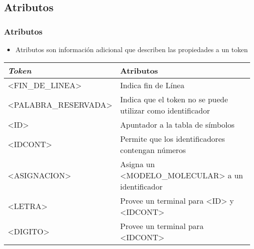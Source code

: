 \documentclass[14pt, aspectratio=169]{beamer}
\begin{document}
\subsection{Atributos}

\begin{frame}
    \frametitle{Atributos}
    \footnotesize
    \begin{itemize}
        \item Atributos son información adicional que describen las propiedades a un token
    \end{itemize}
    \begin{tabularx}{\textwidth}{|X|X|}
        \hline
        \textit{Token}       & Atributos                                                   \\\hline
        <FIN\_DE\_LINEA>     & Indica fin de Línea                                         \\\hline
        <PALABRA\_RESERVADA> & Indica que el token no se puede utilizar como identificador \\\hline
        <ID>                 & Apuntador a la tabla de símbolos                            \\\hline
        <IDCONT>             & Permite que los identificadores contengan números           \\\hline
        <ASIGNACION>         & Asigna un <MODELO\_MOLECULAR> a un identificador            \\\hline
        <LETRA>              & Provee un terminal para <ID> y <IDCONT>                     \\\hline
        <DIGITO>             & Provee un terminal para <IDCONT>                            \\\hline
    \end{tabularx}
\end{frame}
\end{document}

